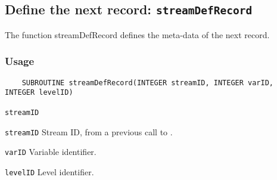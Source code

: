 

\subsection{Define the next record: \texttt{streamDefRecord}}
\label{streamDefRecord}

The function streamDefRecord defines the meta-data of the next record.
\subsubsection*{Usage}

\begin{verbatim}
    SUBROUTINE streamDefRecord(INTEGER streamID, INTEGER varID, INTEGER levelID)
\end{verbatim}

\hspace*{4mm}\begin{minipage}[]{15cm}
\begin{deflist}{\texttt{streamID}\ }
\item[\texttt{streamID}]
Stream ID, from a previous call to {}.
\item[\texttt{varID}]
Variable identifier.
\item[\texttt{levelID}]
Level identifier.

\end{deflist}
\end{minipage}
